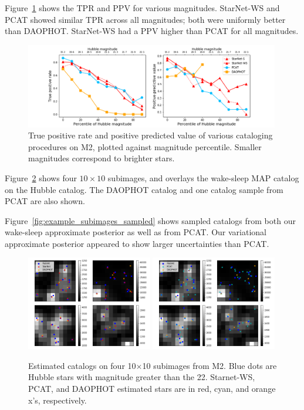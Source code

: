 Figure~\ref{fig:summary_stats} shows the TPR and PPV for various magnitudes.
StarNet-WS and PCAT showed similar TPR across all magnitudes; both were
uniformly better than DAOPHOT. StarNet-WS had a PPV higher than PCAT for all magnitudes. 
\begin{figure}[ht]
    \centering
    \includegraphics[width=0.99\textwidth]{figures/summary_statistics_m2.png}
    \caption{True positive rate and positive predicted value of various cataloging
    procedures on M2, plotted against magnitude percentile.
    Smaller magnitudes correspond to brighter stars. }
    \label{fig:summary_stats}
\end{figure}


Figure~\ref{fig:example_subimages} shows four $10\times10$ subimages, and overlays the wake-sleep MAP catalog on the Hubble catalog. The DAOPHOT catalog and one catalog sample from PCAT are also shown. 

Figure~\ref{fig:example_subimages_sampled} shows sampled catalogs from both our wake-sleep approximate posterior as well as from PCAT.
Our variational approximate posterior appeared to show larger uncertainties
than PCAT. 

\begin{figure}[H]
    \centering
    \includegraphics[width=0.49\textwidth]{figures/example_subimages_ws.png}
    \includegraphics[width=0.49\textwidth]{figures/example_subimages_pcat.png}
    \caption{Estimated catalogs on four 10$\times$10 subimages from
    M2. Blue dots are Hubble stars with magnitude greater than the 22.
    Starnet-WS, PCAT, and DAOPHOT estimated stars are in
    red, cyan, and orange x's, respectively. }
    \label{fig:example_subimages}
\end{figure}

